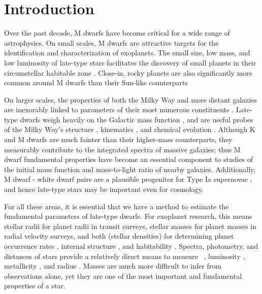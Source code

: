 \documentclass[twocolumn]{aastex62}
\begin{document}
\NewPageAfterKeywords

%



\section{Introduction}\label{sec:intro}
Over the past decade, M dwarfs have become critical for a wide range of astrophysics. On small scales, M dwarfs are attractive targets for the identification and characterization of exoplanets. The small size, low mass, and low luminosity of late-type stars facilitates the discovery of small planets \citep[e.g.][]{Muirhead2012,Martinez:2017aa,Mann:2018} in their circumstellar habitable zone \citep[e.g.,][]{Tarter2007,Shields:2016aa,Dittmann2017b}. Close-in, rocky planets are also significantly more common around M dwarfs than their Sun-like counterparts \citep{Dressing2013,2013PNAS..11019273P,Mulders2015,Gaidos2016b}

On larger scales, the properties of both the Milky Way and more distant galaxies are inexorably linked to parameters of their most numerous constituents \citep[$>70$\% of stars in the Solar neighborhood are M dwarfs,][]{Henry:1994fk,Reid:2004lr}. Late-type dwarfs weigh heavily on the Galactic mass function \citep[e.g.,][]{Covey:2008lr}, and are useful probes of the Milky Way's structure \citep[e.g.,][]{2008ApJ...673..864J,2017ApJ...843..141F}, kinematics \citep[e.g.,][]{2007AJ....134.2418B,2015RAA....15..860Y}, and chemical evolution \citep{Woolf:2012lr,2015AJ....149..140H}. Although K and M dwarfs are much fainter than their higher-mass counterparts, they measurably contribute to the integrated spectra of massive galaxies; thus M dwarf fundamental properties have become an essential component to studies of the initial mass function \citep[e.g.,][]{2012ApJ...747...69C,2016ApJ...821...39M} and mass-to-light ratio \citep{2015MNRAS.452L..21S} of nearby galaxies. Additionally, M dwarf - white dwarf pairs are a plausible progenitor for Type Ia supernovae \citep{2012ApJ...758..123W}, and hence late-type stars may be important even for cosmology.

For all these areas, it is essential that we have a method to estimate the fundamental parameters of late-type dwarfs. For exoplanet research, this means stellar radii for planet radii in transit surveys, stellar masses for planet masses in radial velocity surveys, and both (stellar densities) for determining planet occurrence rates \citep[e.g.,][]{2010exop.book...55W,Gaidos2013}, internal structure \citep[e.g.,][]{Rogers:2011lr}, and habitability \citep[e.g.,][]{Gaidos2013a,Kane2017}. Spectra, photometry, and distances of stars provide a relatively direct means to measure \teff\ \citep[e.g.,][]{Rojas-Ayala:2012uq,Mann2013c}, luminosity \citep[e.g.,][]{2002AJ....124.2721R}, metallicity \citep[e.g.,][]{Bonfils:2005,RojasAyala:2010}, and radius \citep[e.g., via Stefan-Boltzmann, ][]{Newton2015A,Kesseli:2018aa}. Masses are much more difficult to infer from observations alone, yet they are one of the most important and fundamental properties of a star.  
\end{document}
